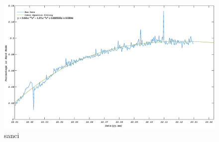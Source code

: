 \documentclass[12pt]{article}  %
\begin{document}
\begin{figure}[htbp]
\centering
\includegraphics[width=\textwidth]{img/sanci.eps}
\caption{sanci}
\end{figure}
\end{document}
